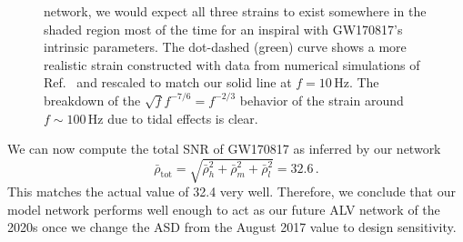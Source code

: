 \documentclass[prd,amsmath,amssymb,aps,floats,amsfonts,notitlepage,superscriptaddress,eqsecnum,nofootinbib,10pt]{revtex4-1}
\newcommand{\be}{\begin{equation}}
\newcommand{\ee}{\end{equation}}
\begin{document}
\begin{figure}[ht!]
{network, we would expect all three strains to exist somewhere in the shaded region most of the time for an inspiral with GW170817's intrinsic parameters. %
The dot-dashed (green) curve shows a more realistic strain constructed with data from numerical simulations of Ref.~\cite{Read:2009yp}
and rescaled to match our solid line at $f=10\,$Hz.
The breakdown of the $\sqrt{f}f^{-7/6}=f^{-2/3}$ behavior of
the strain around $f\sim100\,$Hz due to tidal effects is clear.
}
\label{fig:figGW170817}
\end{figure}
%
%

We can now compute the total SNR of GW170817 as inferred by our network
%
\be
\bar\rho_\text{tot}= \sqrt{\bar\rho^2_h+\bar\rho^2_m+\bar\rho^2_l}= 32.6 \, \label{eq:SNR_total_GW170817} .
\ee
%
This matches the actual value of 32.4 very well. Therefore, we conclude that our model network performs well enough to 
act as our future ALV network of the 2020s once we change
the ASD from the August 2017 value to design sensitivity.
%
%
%
%
%
\end{document}

